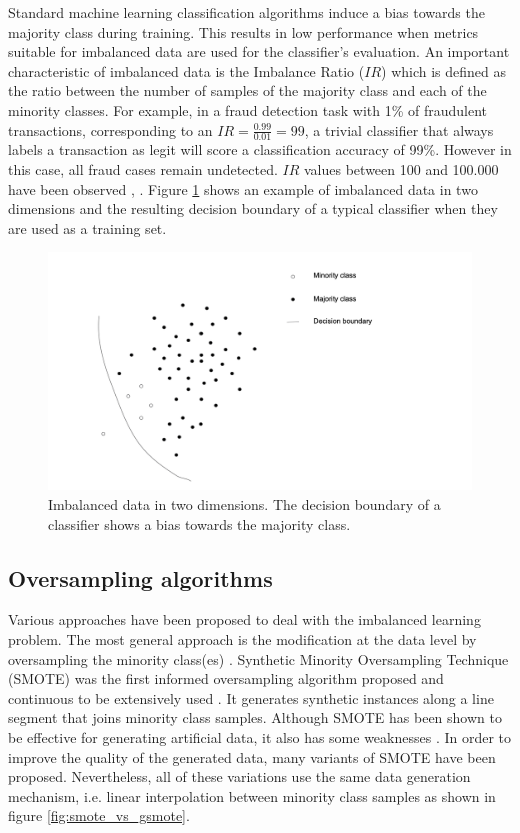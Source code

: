 \documentclass[preprint,12pt, a4paper]{elsarticle}
\begin{document}
Standard machine learning classification algorithms induce a bias towards the majority class during training. This results in low performance when metrics suitable for imbalanced data are used for the classifier's evaluation. An important characteristic of imbalanced data is the Imbalance Ratio ($IR$) which is defined as the ratio between the number of samples of the majority class and each of the minority classes. For example, in a fraud detection task with 1\% of fraudulent transactions, corresponding to an $IR=\frac{0.99}{0.01}=99$, a trivial classifier that always labels a transaction as legit will score a classification accuracy of 99\%. However in this case, all fraud cases remain undetected. $IR$ values between 100 and 100.000 have been observed \cite{Chawla2002}, \cite{Barua2014}. Figure \ref{fig:imbalanced} shows an example of imbalanced data in two dimensions and the resulting decision boundary of a typical classifier when they are used as a training set.

\begin{figure}[H]
	\centering
    \includegraphics[width=14cm, keepaspectratio]{../analysis/imbalanced_problem}
    \caption{Imbalanced data in two dimensions. The decision boundary of a classifier shows a bias towards the majority class.}
    \label{fig:imbalanced}
\end{figure}

\subsection{Oversampling algorithms}
\label{oversampling}

Various approaches have been proposed to deal with the imbalanced learning problem. The most general approach is the modification at the data level by oversampling the minority class(es) \cite{Fernandez2013}. Synthetic Minority
Oversampling Technique (SMOTE) was the first informed oversampling algorithm proposed and continuous to be extensively used \cite{Chawla2002}. It generates synthetic instances along a line segment that joins minority class samples. Although SMOTE has been shown to be effective for generating artificial data, it also has some weaknesses \cite{He2009}. In order to improve the quality of the generated data, many variants of SMOTE have been proposed. Nevertheless, all of these variations use the same data generation mechanism, i.e. linear interpolation between minority class samples as shown in figure \ref{fig:smote_vs_gsmote}.
\end{document}
